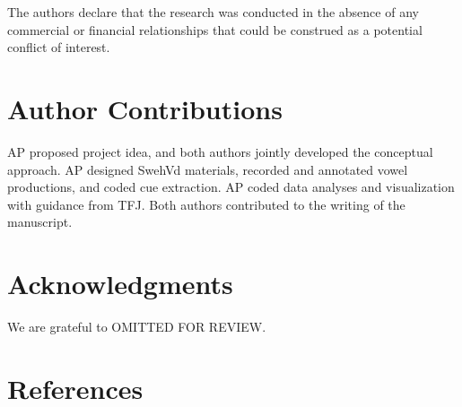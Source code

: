 \documentclass[utf8]{frontiersSCNS}
\begin{document}
The authors declare that the research was conducted in the absence of any
commercial or financial relationships that could be construed as a potential
conflict of interest.

\hypertarget{author-contributions}{%
\section*{Author Contributions}\label{author-contributions}}

AP proposed project idea, and both authors jointly developed the conceptual approach. AP designed SwehVd materials, recorded and annotated vowel productions, and coded cue extraction. AP coded data analyses and visualization with guidance from TFJ. Both authors contributed to the writing of the manuscript.

\hypertarget{acknowledgments}{%
\section*{Acknowledgments}\label{acknowledgments}}

We are grateful to OMITTED FOR REVIEW.

\hypertarget{sec:references}{%
\section*{References}\label{sec:references}}

\begingroup
\setlength{\parindent}{-0.5in}
\setlength{\leftskip}{0.5in}
\end{document}
